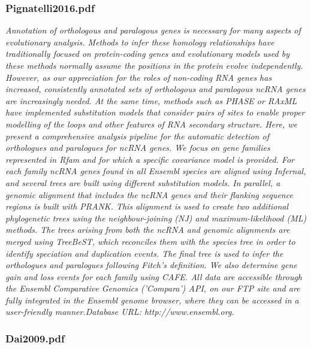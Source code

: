 \subsubsection{Pignatelli2016.pdf}
\cite{Pignatelli2016}
\textit{Annotation of orthologous and paralogous genes is necessary for many aspects of evolutionary analysis. Methods to infer these homology relationships have traditionally focused on protein-coding genes and evolutionary models used by these methods normally assume the positions in the protein evolve independently. However, as our appreciation for the roles of non-coding RNA genes has increased, consistently annotated sets of orthologous and paralogous ncRNA genes are increasingly needed. At the same time, methods such as PHASE or RAxML have implemented substitution models that consider pairs of sites to enable proper modelling of the loops and other features of RNA secondary structure. Here, we present a comprehensive analysis pipeline for the automatic detection of orthologues and paralogues for ncRNA genes. We focus on gene families represented in Rfam and for which a specific covariance model is provided. For each family ncRNA genes found in all Ensembl species are aligned using Infernal, and several trees are built using different substitution models. In parallel, a genomic alignment that includes the ncRNA genes and their flanking sequence regions is built with PRANK. This alignment is used to create two additional phylogenetic trees using the neighbour-joining (NJ) and maximum-likelihood (ML) methods. The trees arising from both the ncRNA and genomic alignments are merged using TreeBeST, which reconciles them with the species tree in order to identify speciation and duplication events. The final tree is used to infer the orthologues and paralogues following Fitch's definition. We also determine gene gain and loss events for each family using CAFE. All data are accessible through the Ensembl Comparative Genomics ('Compara') API, on our FTP site and are fully integrated in the Ensembl genome browser, where they can be accessed in a user-friendly manner.Database URL: http://www.ensembl.org.}
\subsubsection{Dai2009.pdf}

